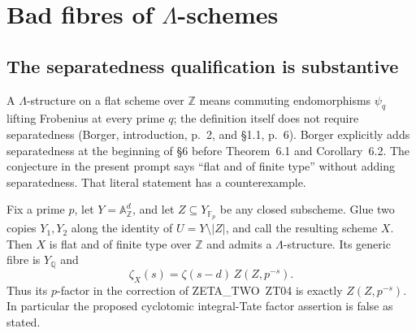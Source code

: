 
\section{Bad fibres of $\Lambda$-schemes}

\subsection{The separatedness qualification is substantive}

A $\Lambda$-structure on a flat scheme over $\mathbb Z$ means commuting
endomorphisms $\psi_q$ lifting Frobenius at every prime $q$; the definition
itself does not require separatedness (Borger, introduction, p.~2, and
\S1.1, p.~6).  Borger explicitly adds separatedness at the beginning of
\S6 before Theorem~6.1 and Corollary~6.2.  The conjecture in the present
prompt says ``flat and of finite type'' without adding separatedness.
That literal statement has a counterexample.

\begin{theorem}
\label{NX-L01}
Fix a prime $p$, let $Y=\mathbb A^d_{\mathbb Z}$, and let
$Z\subseteq Y_{\mathbb F_p}$ be any closed subscheme.  Glue two copies
$Y_1,Y_2$ along the identity of $U=Y\setminus |Z|$, and call the resulting
scheme $X$.  Then $X$ is flat and of finite type over $\mathbb Z$ and
admits a $\Lambda$-structure.  Its generic fibre is $Y_{\mathbb Q}$ and
\[
 \zeta_X(s)=\zeta(s-d)\,Z(Z,p^{-s}).
\]
Thus its $p$-factor in the correction of ZETA\_TWO~ZT04 is exactly
$Z(Z,p^{-s})$.  In particular the proposed cyclotomic integral-Tate
factor assertion is false as stated.
\end{theorem}


